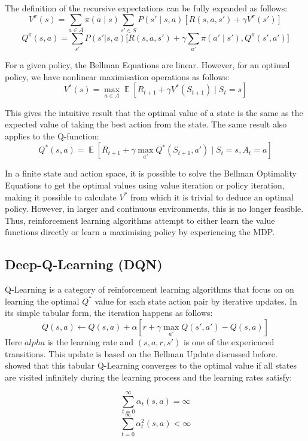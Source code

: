 \documentclass[12pt,a4paper]{report}
\DeclareMathOperator{\EX}{\mathbb{E}}
\begin{document}
The definition of the recursive expectations can be fully expanded as follows:
\[
V^{\pi}(s) = \sum_{a \in A} \pi(a \mid s) \sum_{s' \in S} P(s' \mid s, a) \left[ R(s, a, s') + \gamma V^{\pi}(s') \right]
\]
\[
Q^\pi(s,a) = \sum_{s'}P(s'|s,a)\big[ R(s,a,s') + \gamma \sum_{a'}\pi(a'\mid s'),Q^\pi(s',a')\big]
\] \par

For a given policy, the Bellman Equations are linear. However, for an optimal policy, we have nonlinear maximisation operations as follows: 
\[
  V^*(s) = \max_{a \in A}\EX[ R_{t+1} + \gamma V^*(S_{t+1}) \mid S_{t}= s]
\] \par

This gives the intuitive result that the optimal value of a state is the same as the expected value of taking the best action from the state. The same result also applies to the Q-function:
\[
Q^*(s, a) = \EX [ R_{t+1} + \gamma \max_{a'} Q^*(S_{t+1}, a') \mid S_t = s, A_t = a ]
\] \par

In a finite state and action space, it is possible to solve the Bellman Optimality Equations to get the optimal values using value iteration or policy iteration, making it possible to calculate $V^*$ from which it is trivial to deduce an optimal policy. However, in larger and continuous environments, this is no longer feasible. Thus, reinforcement learning algorithms attempt to either learn the value functions directly or learn a maximising policy by experiencing the MDP. \par

\subsection{Deep-Q-Learning (DQN)}

Q-Learning is a category of reinforcement learning algorithms that focus on on learning the optimal $Q^*$ value for each state action pair by iterative updates. In its simple tabular form, the iteration happens as follows:
\[Q(s, a) \leftarrow Q(s, a) + \alpha [ r + \gamma \max_{a'} Q(s', a') - Q(s, a) ]\]
Here $alpha$ is the learning rate and $(s,a,r,s')$ is one of the expericnced transitions. This update is based on the Bellman Update discussed before. \cite{Watkins1992} showed that this tabular Q-Learning converges to the optimal value if all states are visited infinitely during the learning process and the learning rates satisfy: 

\[
\sum_{t=0}^{\infty} \alpha_t(s, a) = \infty
\]
\[
\sum_{t=0}^{\infty} \alpha_t^2(s, a) < \infty
\]
\end{document}
